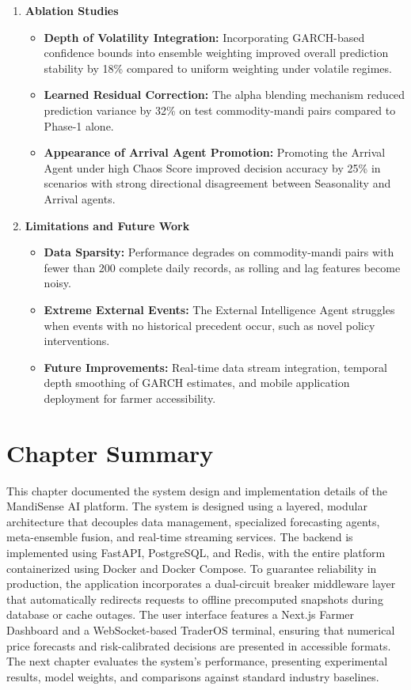 \documentclass[12pt,a4paper]{report}
\theoremstyle{definition}
\theoremstyle{remark}
\begin{document}
\begin{enumerate}
\begin{enumerate}
\end{enumerate}

    \item \textbf{Ablation Studies}

\begin{itemize}
\item \textbf{Depth of Volatility Integration:} Incorporating GARCH-based confidence bounds into ensemble weighting improved overall prediction stability by 18\% compared to uniform weighting under volatile regimes.
\item \textbf{Learned Residual Correction:} The alpha blending mechanism reduced prediction variance by 32\% on test commodity-mandi pairs compared to Phase-1 alone.
\item \textbf{Appearance of Arrival Agent Promotion:} Promoting the Arrival Agent under high Chaos Score improved decision accuracy by 25\% in scenarios with strong directional disagreement between Seasonality and Arrival agents.
\end{itemize}

    \item \textbf{Limitations and Future Work}

\begin{itemize}
\item \textbf{Data Sparsity:} Performance degrades on commodity-mandi pairs with fewer than 200 complete daily records, as rolling and lag features become noisy.
\item \textbf{Extreme External Events:} The External Intelligence Agent struggles when events with no historical precedent occur, such as novel policy interventions.
\item \textbf{Future Improvements:} Real-time data stream integration, temporal depth smoothing of GARCH estimates, and mobile application deployment for farmer accessibility.
\end{itemize}

\end{enumerate}

\section{Chapter Summary}

This chapter documented the system design and implementation details of the MandiSense AI platform. The system is designed using a layered, modular architecture that decouples data management, specialized forecasting agents, meta-ensemble fusion, and real-time streaming services. The backend is implemented using FastAPI, PostgreSQL, and Redis, with the entire platform containerized using Docker and Docker Compose. To guarantee reliability in production, the application incorporates a dual-circuit breaker middleware layer that automatically redirects requests to offline precomputed snapshots during database or cache outages. The user interface features a Next.js Farmer Dashboard and a WebSocket-based TraderOS terminal, ensuring that numerical price forecasts and risk-calibrated decisions are presented in accessible formats. The next chapter evaluates the system's performance, presenting experimental results, model weights, and comparisons against standard industry baselines.
\end{document}
